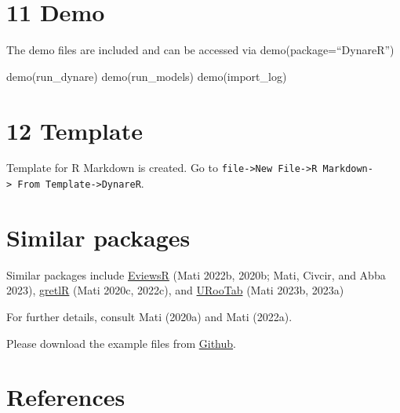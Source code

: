 \documentclass[
  letterpaper,
  DIV=11,
  numbers=noendperiod]{scrartcl}
\newenvironment{Shaded}{\begin{snugshade}}{\end{snugshade}}
\newcommand{\FunctionTok}[1]{\textcolor[rgb]{0.28,0.35,0.67}{#1}}
\newcommand{\NormalTok}[1]{\textcolor[rgb]{0.00,0.23,0.31}{#1}}
\begin{document}
\hypertarget{demo}{%
\section{11 Demo}\label{demo}}

The demo files are included and can be accessed via
demo(package=``DynareR'')

\begin{Shaded}
\begin{Highlighting}[]
\FunctionTok{demo}\NormalTok{(run\_dynare)}
\FunctionTok{demo}\NormalTok{(run\_models)}
\FunctionTok{demo}\NormalTok{(import\_log)}
\end{Highlighting}
\end{Shaded}

\hypertarget{template}{%
\section{12 Template}\label{template}}

Template for R Markdown is created. Go to
\texttt{file-\textgreater{}New\ File-\textgreater{}R\ Markdown-\textgreater{}\ From\ Template-\textgreater{}DynareR}.

\hypertarget{similar-packages}{%
\section{Similar packages}\label{similar-packages}}

Similar packages include
\href{https://github.com/sagirumati/EviewsR}{EviewsR} (Mati 2022b,
2020b; Mati, Civcir, and Abba 2023),
\href{https://github.com/sagirumati/gretlR}{gretlR} (Mati 2020c, 2022c),
and \href{https://github.com/sagirumati/URooTab}{URooTab} (Mati 2023b,
2023a)

For further details, consult Mati (2020a) and Mati (2022a).

Please download the example files from
\href{https://github.com/sagirumati/DynareR/tree/master/inst/examples/}{Github}.

\hypertarget{references}{%
\section*{References}\label{references}}
\end{document}
